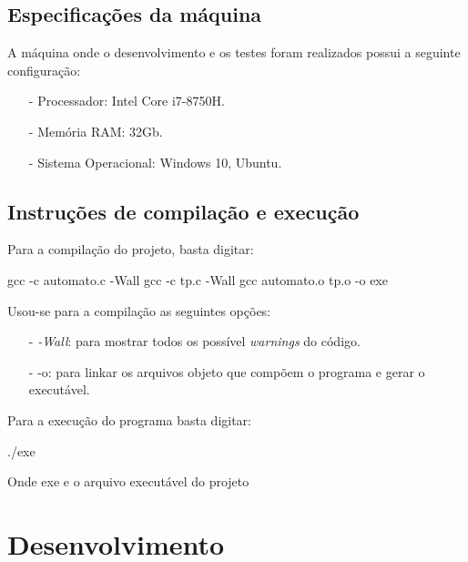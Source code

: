 \documentclass{article}
\begin{document}
\subsection{Especificações da máquina}
A máquina onde o desenvolvimento e os testes foram realizados possui a seguinte configuração:
\begin{itemize}
    \item[-] Processador: Intel Core i7-8750H.
    \item[-] Memória RAM: 32Gb.
    \item[-] Sistema Operacional: Windows 10, Ubuntu.
\end{itemize}

\subsection{Instruções de compilação e execução}

Para a compilação do projeto, basta digitar:

\begin{tcolorbox}[title=Compilando o projeto,width=\linewidth]
    gcc -c automato.c -Wall
    gcc -c tp.c -Wall
    gcc automato.o tp.o -o exe
\end{tcolorbox}

Usou-se para a compilação as seguintes opções:
\begin{itemize}
    \item [-] \emph{-Wall}: para mostrar todos os possível \emph{warnings} do código.
    \item [-] -o: para linkar os arquivos objeto que compõem o programa e gerar o executável. 
\end{itemize}

Para a execução do programa basta digitar:
\begin{tcolorbox}[title=,width=\linewidth]
    ./exe 
\end{tcolorbox}

Onde exe e o arquivo executável do projeto 

\clearpage
\section{Desenvolvimento}

\noindent{}
\end{document}
